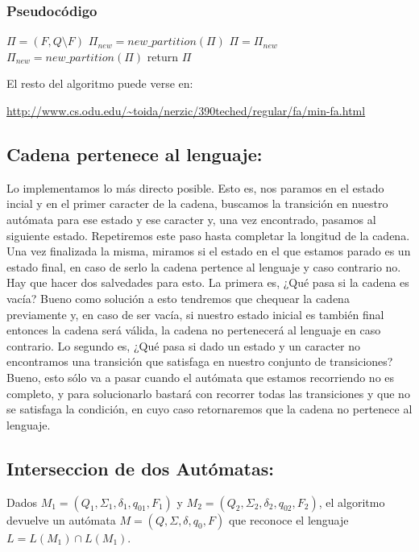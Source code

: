 \subsubsection{Pseudocódigo}

\begin{algorithm}
  \begin{algorithmic}
      \State $\Pi = (F, Q \setminus F)$
      \State $\Pi_{new} = new\_partition(\Pi)$
        \State $\Pi = \Pi_{new}$
        \State $\Pi_{new} = new\_partition(\Pi)$
      \EndWhile
      \State return $\Pi$
    \EndFunction
  \end{algorithmic}
\end{algorithm}

El resto del algoritmo puede verse en:

\url{http://www.cs.odu.edu/~toida/nerzic/390teched/regular/fa/min-fa.html}


\subsection{Cadena pertenece al lenguaje:}
Lo implementamos lo más directo posible. Esto es, nos paramos en el estado incial y en el primer caracter de la cadena, buscamos la transición en nuestro autómata para ese estado y ese caracter y, una vez encontrado, pasamos al siguiente estado. Repetiremos este paso hasta completar la longitud de la cadena. Una vez finalizada la misma, miramos si el estado en el que estamos parado es un estado final, en caso de serlo la cadena pertence al lenguaje y caso contrario no.\newline
Hay que hacer dos salvedades para esto. La primera es, ¿Qué pasa si la cadena es vacía? Bueno como solución a esto tendremos que chequear la cadena previamente y, en caso de ser vacía, si nuestro estado inicial es también final entonces la cadena será válida, la cadena no pertenecerá al lenguaje en caso contrario. Lo segundo es, ¿Qué pasa si dado un estado y un caracter no encontramos una transición que satisfaga en nuestro conjunto de transiciones? Bueno, esto sólo va a pasar cuando el autómata que estamos recorriendo no es completo, y para solucionarlo bastará con recorrer todas las transiciones y que no se satisfaga la condición, en cuyo caso retornaremos que la cadena no pertenece al lenguaje.

\subsection{Interseccion de dos Autómatas:}
Dados $M_{1} = (Q_{1}, \Sigma_{1}, \delta_{1}, q_{01}, F_{1})$ y $M_{2} = (Q_{2}, \Sigma_{2}, \delta_{2}, q_{02}, F_{2})$,
el algoritmo devuelve un autómata $M = (Q, \Sigma, \delta, q_{0}, F)$ que reconoce el lenguaje $L = L(M_{1}) \cap L(M_{1})$.

